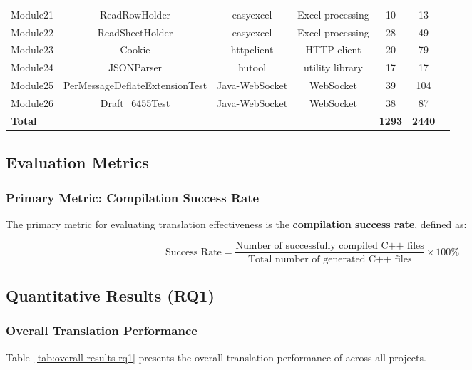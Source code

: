 \begin{table}[h]
\begin{tabular}{lcccccc}
\midrule
Module21 & ReadRowHolder & easyexcel & Excel processing & 10 & 13 \\
Module22 & ReadSheetHolder & easyexcel & Excel processing & 28 & 49 \\
\midrule
Module23 & Cookie & httpclient & HTTP client & 20 & 79 \\
\midrule
Module24 & JSONParser & hutool & utility library & 17 & 17 \\
\midrule
Module25 & PerMessageDeflateExtensionTest & Java-WebSocket & WebSocket & 39 & 104 \\
Module26 & Draft_6455Test & Java-WebSocket & WebSocket & 38 & 87 \\
\midrule
\textbf{Total} & & & & \textbf{1293} & \textbf{2440} \\
\bottomrule
\end{tabular}
\end{table}

\subsection{Evaluation Metrics}

\subsubsection{Primary Metric: Compilation Success Rate}

The primary metric for evaluating translation effectiveness is the \textbf{compilation success rate}, defined as:

\begin{equation}
\text{Success Rate} = \frac{\text{Number of successfully compiled C++ files}}{\text{Total number of generated C++ files}} \times 100\%
\end{equation}

\subsection{Quantitative Results (RQ1)}

\subsubsection{Overall Translation Performance}

Table~\ref{tab:overall-results-rq1} presents the overall translation performance of \tool{} across all projects.


